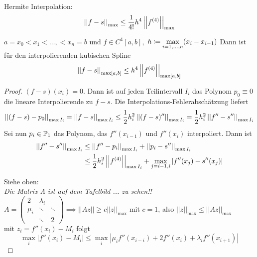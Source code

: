 \begin{question}\hfill\\
    \begin{reminder} Hermite Interpolation:\[
        \left\vert\left\vert f-s\right\vert\right\vert_{\max}\leq \frac{1}{4!}h^4\left\vert\left\vert f^{(4)}\right\vert\right\vert_{\max}\]    
    \end{reminder}
\end{question}
\begin{theorem}
    $a = x_0 < x_1 < \dots, < x_n = b$ und $f\in C^4[a,b],$ $h\coloneqq \max\limits_{i = 1,\dots, n}(x_i - x_{i-1})$
    Dann ist für den interpolierenden kubischen Spline \[
        \left\vert\left\vert f-s\right\vert\right\vert_{\max[a,b]} \leq h^4\left\vert\left\vert f^{(4)}\right\vert\right\vert_{\max[a,b]}\]
\end{theorem}
\begin{proof}
    $(f-s)(x_i) = 0$. Dann ist auf jeden Teilintervall $I_i$ das Polynom $p_0\equiv0$ die lineare Interpolierende
    zu $f-s$. Die Interpolations-Fehlerabschätzung liefert\[
        \left\vert\left\vert(f-s) - p_0\right\vert\right\vert_{\max I_i} = \left\vert\left\vert f-s\right\vert\right\vert_{\max I_i} \leq \frac{1}{2}h_i^2\left\vert\left\vert(f-s)''\right\vert\right\vert_{\max I_i} = \frac{1}
        {2}h_i^2\left\vert\left\vert f''-s''\right\vert\right\vert_{\max I_i}\]
    Sei nun $p_i\in \mathbb{P}_1$ das Polynom, das $f''(x_{i-1})$ und $f''(x_i)$ interpoliert. Dann ist \begin{align*}
        \left\vert\left\vert f'' - s''\right\vert\right\vert_{\max I_i} &\leq \left\vert\left\vert f'' - p_i\right\vert\right\vert_{\max I_i} + \left\vert\left\vert p_i - s''\right\vert\right\vert_{\max I_i}\\
                                    &\leq \frac{1}{2}h_i^2\left\vert\left\vert f^{(4)}\right\vert\right\vert_{\max I_i} + \max\limits_{j = i-1, i}\left\vert f''(x_j) 
                                    - s''(x_j) \right\vert
    \end{align*}

Siehe oben: 
\\
\textit{Die Matrix A ist auf dem Tafelbild ... zu sehen!!} \frownie 
\\
\(
A=\begin{pmatrix}
    2 & \lambda_i & \ \\
    \mu_i & \ddots & \ddots \\
    \ & \ddots & 2
\end{pmatrix} \implies ||Az|| \geq c||z||_{\text{max}} \) mit \(c=1\), also \(||z||_{\text{max}}\leq||Az||_{\text{max}}\)\\
mit \(z_i= f''(x_i)-M_i\) folgt \[\max\limits_{i}|f''(x_i)-M_i|\leq \max\limits_{i}|\mu_if''(x_{i-i})+2f''(x_i)+
\lambda_if''(x_{i+1})|\]
\end{proof}


